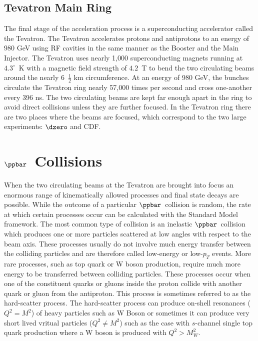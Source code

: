 \subsection{Tevatron Main Ring}
The final stage of the acceleration process is a superconducting accelerator called the Tevatron. The Tevatron accelerates protons and antiprotons to an energy of 980 GeV using RF cavities in the same manner as the Booster and the Main Injector. The Tevatron uses nearly 1,000 superconducting magnets running at $4.3^{\circ}$~K with a magnetic field strength of $4.2$~T to bend the two circulating beams around the nearly 6~$\frac{1}{2}$ km circumference. At an energy of 980 GeV, the bunches circulate the Tevatron ring nearly 57,000 times per second and cross one-another every 396 ns. The two circulating beams are kept far enough apart in the ring to avoid direct collisions unless they are further focused. In the Tevatron ring there are two places where the beams are focused, which correspond to the two large experiments: $\dzero$ and CDF.


\section{$\ppbar$~Collisions}
\label{ppbarcollisions}

When the two circulating beams at the Tevatron are brought into focus an enormous range of kinematically allowed processes and final state decays are possible. While the outcome of a particular $\ppbar$~collision is random, the rate at which certain processes occur can be calculated with the Standard Model framework. The most common type of collision is an inelastic $\ppbar$~collision which produces one or more particles scattered at low angles with respect to the beam axis. These processes usually do not involve much energy transfer between the colliding particles and are therefore called low-energy or low-$p_{T}$ events. More rare processes, such as top quark or W boson production, require much more energy to be transferred between colliding particles. These processes occur when one of the constituent quarks or gluons inside the proton collide with another quark or gluon from the antiproton. This process is sometimes referred to as the hard-scatter process. The hard-scatter process can produce on-shell resonances ($Q^{2} = M^{2}$) of heavy particles such as W Boson or sometimes it can produce very short lived vritual particles ($Q^{2} \neq M^{2}$) such as the case with $s$-channel single top quark production where a W boson is produced with $Q^{2} > M_{W}^{2}$.

